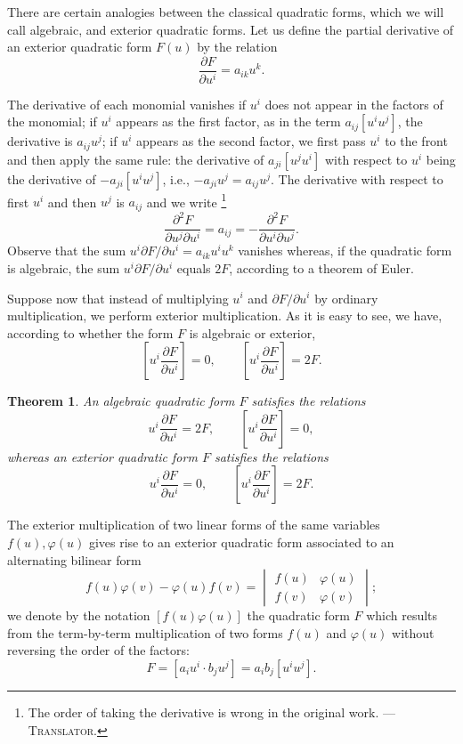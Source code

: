 \documentclass[leqno,11pt]{book}
\numberwithin{equation}{chapter}
\newcommand{\pd}{\partial}
\theoremstyle{shape1}
\newtheorem*{thm*}{\hspace{15pt}Theorem}
\theoremstyle{shape0}
\theoremstyle{shape2}
\theoremstyle{definition}
\begin{document}
\vspace{12pt}\fsec There are certain analogies between the classical quadratic forms, which we will call algebraic, and exterior quadratic forms. Let us define the partial derivative of an exterior quadratic form $F(u)$ by the relation
\[
\frac{\pd F}{\pd u^{i}}=a_{ik}u^{k}.
\]

The derivative of each monomial vanishes if $u^{i}$ does not appear in the factors of the monomial; if $u^{i}$ appears as the first factor, as in the term $a_{ij}[u^{i}u^{j}]$, the derivative is $a_{ij}u^{j}$; if $u^{i}$ appears as the second factor, we first pass $u^{i}$ to the front and  then apply the same rule: the derivative of $a_{ji}[u^{j}u^{i}]$ with respect to $u^{i}$ being the derivative of $-a_{ji}[u^{i}u^{j}]$, {i.e.}, $-a_{ji}u^{j}=a_{ij}u^{j}$. The derivative with respect to first $u^{i}$ and then $u^{j}$ is $a_{ij}$ and we write \footnote{The order of taking the derivative is wrong in the original work. --- \textsc{Translator.}}
\[
\frac{\pd ^{2}F}{\pd u^{j}\pd u^{i}}=a_{ij}=-\frac{\pd^{2}F}{\pd u^{i}\pd u^{j}}.
\]
Observe that the sum $u^{i}\pd F/\pd u^{i}=a_{ik}u^{i}u^{k}$ vanishes whereas, if the quadratic form is algebraic, the sum $u^{i}\pd F/\pd u^{i}$ equals $2F$, according to a theorem of Euler.

Suppose now that instead of multiplying $u^{i}$ and $\pd F/\pd u^{i}$ by ordinary multiplication, we perform exterior multiplication. As it is easy to see, we have, according to whether the form $F$ is algebraic or exterior,
\begin{equation}
  \label{eq:3}
  \left[u^{i}\frac{\pd F}{\pd u^{i}}\right]=0,\qquad
  \left[u^{i}\frac{\pd F}{\pd u^{i}}\right]=2F.
\end{equation}
\begin{thm*}
  An algebraic quadratic form $F$ satisfies the relations
\[
u^{i}\frac{\pd F}{\pd u^{i}}=2F,\qquad\left[u^{i}\frac{\pd F}{\pd u^{i}}\right]=0,
\]
whereas an exterior quadratic form $F$ satisfies the relations
\[
u^{i}\frac{\pd F}{\pd u^{i}}=0,\qquad\left[u^{i}\frac{\pd F}{\pd u^{i}}\right]=2F.
\]
\end{thm*}

\vspace{12pt}\fsec The exterior multiplication of two linear forms of the same variables $f(u), \varphi(u)$ gives rise to an exterior quadratic form associated to an alternating bilinear form
\[
f(u)\varphi(v)-\varphi(u)f(v)=
\begin{vmatrix}
  f(u)&\varphi(u)\\
  f(v)&\varphi(v)
\end{vmatrix}
;
\]
we denote by the notation $[f(u)\varphi(u)]$ the quadratic form $F$ which results from the term-by-term multiplication of two forms $f(u)$ and $\varphi(u)$ without reversing the order of the factors:
\begin{equation}
  \label{eq:4}
  F=[a_{i}u^{i}\cdot b_{j}u^{j}]=a_{i}b_{j}[u^{i}u^{j}].
\end{equation}
\end{document}
